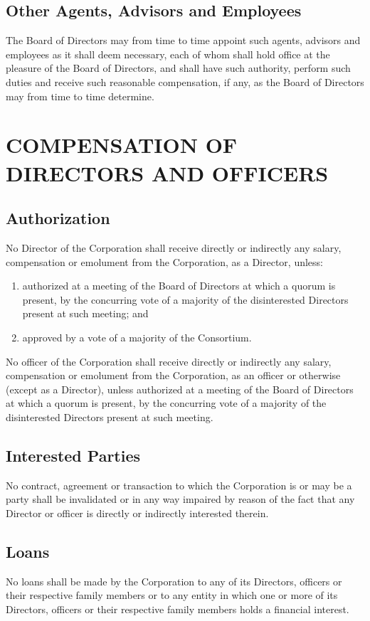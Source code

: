\documentclass{article}
\begin{document}
\subsection{Other Agents, Advisors and Employees}
The Board of Directors may from time to time appoint such agents, advisors and employees as it shall deem necessary, each of whom shall hold office at the pleasure of the Board of Directors, and shall have such authority, perform such duties and receive such reasonable compensation, if any, as the Board of Directors may from time to time determine.
\section{COMPENSATION OF DIRECTORS AND OFFICERS}
\subsection{Authorization}
No Director of the Corporation shall receive directly or indirectly any salary, compensation or emolument from the Corporation, as a Director, unless:
\begin{enumerate}
\item authorized at a meeting of the Board of Directors at which a quorum is present, by the concurring vote of a majority of the disinterested Directors present at such meeting; and
\item approved by a vote of a majority of the Consortium.
\end{enumerate}
No officer of the Corporation shall receive directly or indirectly any salary, compensation or emolument from the Corporation, as an officer or otherwise (except as a Director), unless authorized at a meeting of the Board of Directors at which a quorum is present, by the concurring vote of a majority of the disinterested Directors present at such meeting.
\subsection{Interested Parties}
No contract, agreement or transaction to which the Corporation is or may be a party shall be invalidated or in any way impaired by reason of the fact that any Director or officer is directly or indirectly interested therein.
\subsection{Loans}
No loans shall be made by the Corporation to any of its Directors, officers or their respective family members or to any entity in which one or more of its Directors, officers or their respective family members holds a financial interest.
\end{document}
